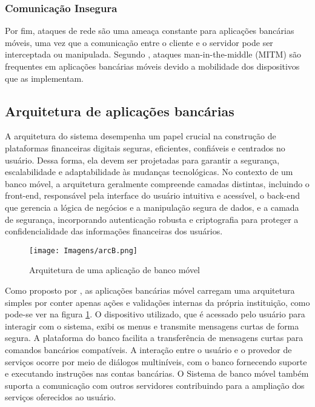     \subsubsection{Comunicação Insegura}
    Por fim, ataques de rede são uma ameaça constante para aplicações bancárias móveis, uma vez que a comunicação entre o cliente e o servidor pode ser interceptada ou manipulada. Segundo , ataques man-in-the-middle (MITM) são frequentes em aplicações bancárias móveis devido a mobilidade dos dispositivos que as implementam. 

    
    \subsection{Arquitetura de aplicações bancárias}
    
    A arquitetura do sistema desempenha um papel crucial na construção de plataformas financeiras digitais seguras, eficientes, confiáveis e centrados no usuário. Dessa forma, ela devem ser projetadas para garantir a segurança, escalabilidade e adaptabilidade às mudanças tecnológicas. No contexto de um banco móvel, a arquitetura geralmente compreende camadas distintas, incluindo o front-end, responsável pela interface do usuário intuitiva e acessível, o back-end que gerencia a lógica de negócios e a manipulação segura de dados, e a camada de segurança, incorporando autenticação robusta e criptografia para proteger a confidencialidade das informações financeiras dos usuários.

    \begin{figure}[H]
    \centering 
    \texttt{[image: Imagens/arcB.png]} 
    \caption{Arquitetura de uma aplicação de banco móvel}
    \label{arcB}
    \end{figure}
    
    Como proposto por , as aplicações bancárias móvel carregam uma arquitetura simples por conter apenas ações e validações internas da própria instituição, como pode-se ver na figura \ref{arcB}. O dispositivo utilizado, que é acessado pelo usuário para interagir com o sistema, exibi os menus e transmite mensagens curtas de forma segura. A plataforma do banco facilita a transferência de mensagens curtas para comandos bancários compatíveis. A interação entre o usuário e o provedor de serviços ocorre por meio de diálogos multiníveis, com o banco fornecendo suporte e executando instruções nas contas bancárias. O Sistema de banco móvel também suporta a comunicação com outros servidores contribuindo para a ampliação dos serviços oferecidos ao usuário.
    


